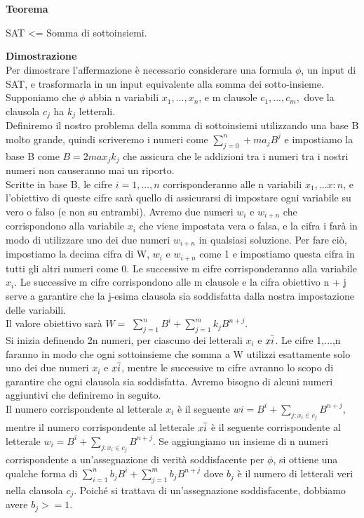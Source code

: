 \\\\\textbf{Teorema}
\begin{center}
    SAT <= Somma di sottoinsiemi.
\end{center}
\textbf{Dimostrazione}\\
Per dimostrare l'affermazione è necessario considerare una formula $\phi$, un input di SAT, e trasformarla in un input equivalente alla somma dei sotto-insieme. 
\\Supponiamo che $\phi$ abbia n variabili $x_1,..., x_n$, e m clausole $c_1,...,c_m,$ dove la clausola $c_j$ ha $k_j$ letterali.
\\Definiremo il nostro problema della somma di sottoinsiemi utilizzando una base B molto grande, quindi scriveremo i numeri come $\sum_{j=0}^n+m a_j B^j$ e impostiamo la base B come $B = 2 max_j k_j$ che assicura che le addizioni tra i numeri tra i nostri numeri non causeranno mai un riporto.
\\Scritte in base B, le cifre $i = 1, . . . , n$ corrisponderanno alle n variabili $x_1,... x:n$, e l'obiettivo di queste cifre sarà quello di assicurarsi di impostare ogni variabile su vero o falso (e non su entrambi). Avremo due numeri $w_i$ e $w_{i+n}$ che corrispondono alla variabile $x_i$ che viene impostata vera o falsa, e la cifra i farà in modo di utilizzare uno dei due numeri $w_{i+n}$ in qualsiasi soluzione. Per fare ciò, impostiamo la decima cifra di W, $w_i$ e $w_{i+n}$ come 1 e impostiamo questa cifra in tutti gli altri numeri come 0. Le successive m cifre corrisponderanno alla variabile $x_i$.
Le successive m cifre corrispondono alle m clausole e la cifra obiettivo n + j serve a garantire che la j-esima clausola sia soddisfatta dalla nostra impostazione delle variabili.
\\Il valore obiettivo sarà $ W= $ $\sum_{j=1}^n B^i + \sum_{j=1}^m k_j B^{n+j}$.
\\Si inizia definendo 2n numeri, per ciascuno dei letterali $x_i$ e $x\Bar{i}$. Le cifre 1,...,n faranno in modo che ogni sottoinsieme che somma a W utilizzi esattamente solo uno dei due numeri $x_i$ e $x\Bar{i}$, mentre le successive m cifre avranno lo scopo di garantire che ogni clausola sia soddisfatta. Avremo bisogno di alcuni numeri aggiuntivi che definiremo in seguito.
\\Il numero corrispondente al letterale $x_i$ è il seguente $wi = B^i + \sum_{j:x_i \in c_j} B^{n+j}$, mentre il numero corrispondente al letterale $x\Bar{i}$ è il seguente
corrispondente al letterale $w_i = B^i + \sum_{j:x_i \in c_j} B^{n+j}$. Se aggiungiamo un insieme di n numeri corrispondente a un'assegnazione di verità soddisfacente per $\phi$, si ottiene una qualche forma di $\sum_{i=1}^n b_j B^{i} + \sum_{j=1}^m b_j B^{n+j} $ dove $b_j$ è il numero di letterali veri nella clausola $c_j$. Poiché si trattava di un'assegnazione soddisfacente, dobbiamo avere $b_j >= 1$.
